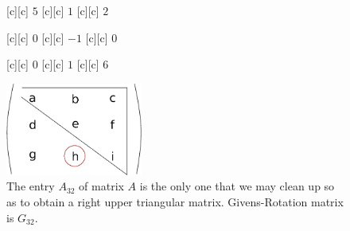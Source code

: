 \begin{figure}[htb!]
	\centering
	\footnotesize

	[c] {$5$}
	[c] {$1$}
	[c] {$2$}

	[c] {$0$}
	[c] {$-1$}
	[c] {$0$}

	[c] {$0$}
	[c] {$1$}
	[c] {$6$}

	\includegraphics[width=0.4\textwidth]{matrixA32.eps}
	\caption{The entry $A_{32}$ of matrix $A$ is the only one that we may clean up
		so as to obtain a right upper triangular matrix. Givens-Rotation matrix is $G_{32}$.}
	\label{\LABEL}
\end{figure}

